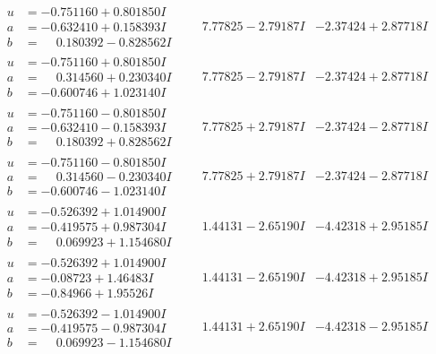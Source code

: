 \documentclass[1p]{elsarticle_modified}
\theoremstyle{definition}
\begin{document}
$$\begin{array}{c|c|c}
\begin{aligned}
u &= -0.751160 + 0.801850 I \\
a &= -0.632410 + 0.158393 I \\
b &= \phantom{-}0.180392 - 0.828562 I\end{aligned}
 & \phantom{-}7.77825 - 2.79187 I & -2.37424 + 2.87718 I \\ \hline\begin{aligned}
u &= -0.751160 + 0.801850 I \\
a &= \phantom{-}0.314560 + 0.230340 I \\
b &= -0.600746 + 1.023140 I\end{aligned}
 & \phantom{-}7.77825 - 2.79187 I & -2.37424 + 2.87718 I \\ \hline\begin{aligned}
u &= -0.751160 - 0.801850 I \\
a &= -0.632410 - 0.158393 I \\
b &= \phantom{-}0.180392 + 0.828562 I\end{aligned}
 & \phantom{-}7.77825 + 2.79187 I & -2.37424 - 2.87718 I \\ \hline\begin{aligned}
u &= -0.751160 - 0.801850 I \\
a &= \phantom{-}0.314560 - 0.230340 I \\
b &= -0.600746 - 1.023140 I\end{aligned}
 & \phantom{-}7.77825 + 2.79187 I & -2.37424 - 2.87718 I \\ \hline\begin{aligned}
u &= -0.526392 + 1.014900 I \\
a &= -0.419575 + 0.987304 I \\
b &= \phantom{-}0.069923 + 1.154680 I\end{aligned}
 & \phantom{-}1.44131 - 2.65190 I & -4.42318 + 2.95185 I \\ \hline\begin{aligned}
u &= -0.526392 + 1.014900 I \\
a &= -0.08723 + 1.46483 I \\
b &= -0.84966 + 1.95526 I\end{aligned}
 & \phantom{-}1.44131 - 2.65190 I & -4.42318 + 2.95185 I \\ \hline\begin{aligned}
u &= -0.526392 - 1.014900 I \\
a &= -0.419575 - 0.987304 I \\
b &= \phantom{-}0.069923 - 1.154680 I\end{aligned}
 & \phantom{-}1.44131 + 2.65190 I & -4.42318 - 2.95185 I \\ \hline\begin{aligned}

\end{aligned}
\end{array}$$
\end{document}
